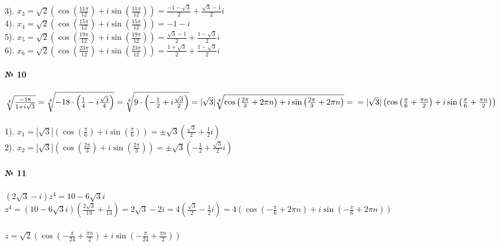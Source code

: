 \documentclass[a4paper, 12pt]{article}
\begin{document}
    \\ 3). $x_3 = \sqrt{2} \left(\cos (\frac{11\pi}{12}) + i \sin (\frac{11\pi}{12}) \right) = \frac{-1 - \sqrt{3}}{2} + \frac{\sqrt{3} - 1}{2}i$
    \\ 4). $x_4 = \sqrt{2} \left(\cos (\frac{15\pi}{12}) + i \sin (\frac{15\pi}{12}) \right) = -1 - i$
    \\ 5). $x_5 = \sqrt{2} \left(\cos (\frac{19\pi}{12}) + i \sin (\frac{19\pi}{12}) \right) = \frac{\sqrt{3} - 1}{2} + \frac{1 - \sqrt{3}}{2}i$
    \\ 6). $x_6 = \sqrt{2} \left(\cos (\frac{23\pi}{12}) + i \sin (\frac{23\pi}{12}) \right) = \frac{1 + \sqrt{3}}{2} + \frac{1 - \sqrt{3}}{2}i$
    \\
    \\ \textbf{№ 10} 
    \\
    \\ $\sqrt[4]{\frac{-18}{1 + i \sqrt{3}}} = \sqrt[4]{-18 \cdot \left(\frac{1}{4} - i \frac{\sqrt{3}}{4}\right)} = \sqrt[4]{9 \cdot \left(-\frac{1}{2} + i \frac{\sqrt{3}}{2}\right)} = |\sqrt{3}| \sqrt[4]{\cos \left(\frac{2\pi}{3} + 2\pi n\right)  + i \sin \left(\frac{2\pi}{3} + 2\pi n\right)} = 
    \\ = |\sqrt{3}| \left(\cos \left(\frac{\pi}{6} + \frac{\pi n}{2}\right)  + i \sin \left(\frac{\pi}{6} + \frac{\pi n}{2}\right) \right)$
    \\
    \\ 1). $x_1 = |\sqrt{3}| \left(\cos \left(\frac{\pi}{6}\right)  + i \sin \left(\frac{\pi}{6}\right) \right) = \pm \sqrt{3}(\frac{\sqrt{3}}{2} + \frac{1}{2}i)$
    \\ 2). $x_2 = |\sqrt{3}| \left(\cos \left(\frac{2\pi}{3}\right)  + i \sin \left(\frac{2\pi}{3}\right) \right) = \pm\sqrt{3}(-\frac{1}{2} + \frac{\sqrt{3}}{2}i)$
    \\
    \\ \textbf{№ 11}
    \\
    \\ $(2\sqrt{3} - i)z^4 = 10 - 6\sqrt{3}i$
    \\ $z^4 = (10 - 6\sqrt{3}i)\left(\frac{2\sqrt{3}}{13} + \frac{i}{13}\right) = 2 \sqrt{3} - 2i = 4\left(\frac{\sqrt{3}}{2} - \frac{1}{2}i\right) = 4\left(\cos \left(-\frac{\pi}{6} + 2\pi n\right) + i\sin \left(-\frac{\pi}{6} + 2\pi n\right)\right)$
    \\
    \\ $z = \sqrt{2}\left(\cos \left(-\frac{\pi}{24} + \frac{\pi n}{2}\right) + i\sin \left(-\frac{\pi}{24} + \frac{\pi n}{2}\right)\right)$
    \\
\end{document}

